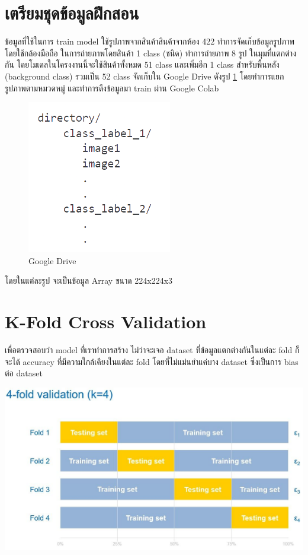 \section{เตรียมชุดข้อมูลฝึกสอน}
ข้อมูลที่ใช้ในการ train model ใช้รูปภาพจากสินค้าสินค้าจากห้อง 422  ทำการจัดเก็บข้อมูลรูปภาพ โดยใช้กล้องมือถือ
ในการถ่ายภาพโดยสินค้า 1 class (ชนิด) ทำการถ่ายภาพ 8 รูป ในมุมที่แตกต่างกัน
โดยโมเดลในโครงงานนี้จะใช้สินค้าทั้งหมด 51 class และเพิ่มอีก 1 class สำหรับพื้นหลัง (background class)
รวมเป็น 52 class
จัดเก็บใน Google Drive ดังรูป  \ref{fig:Google Drive} โดยทำการแยก รูปภาพตามหมวดหมู่ และทำการดึงข้อมูลมา train ผ่าน Google Colab
\begin{figure}[h]
  \begin{center}

    \includegraphics[scale=0.4]{pic/model/st.png}
  \end{center}

  \caption[Google Drive]{Google Drive}
  \label{fig:Google Drive}
\end{figure}
โดยในแต่ละรูป จะเป็นข้อมูล Array ขนาด 224x224x3

\section{K-Fold Cross Validation}

เพื่อตรวจสอบว่า model ที่เราทำการสร้าง ไม่ว่าจะเจอ dataset ที่ข้อมูลแตกต่างกันในแต่ละ fold ก็จะได้ accuracy ที่มีความใกล้เคียงในแต่ละ fold โดยที่ไม่แม่นยำแค่บาง dataset ซึ่งเป็นการ bias ต่อ dataset


\begin{center}
  \includegraphics[scale=0.3]{pic/model/CrossValidation.png}\cite{CrossValidation}
\end{center}

